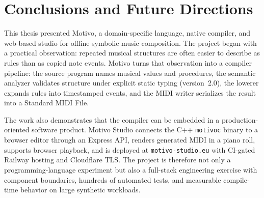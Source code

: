 \chapter{Conclusions and Future Directions}\label{ch:conclusion}

This thesis presented Motivo, a domain-specific language, native compiler, and web-based studio for offline symbolic
music composition.
The project began with a practical observation: repeated musical structures are often easier to describe as rules than
as copied note events.
Motivo turns that observation into a compiler pipeline: the source program names musical values and procedures, the
semantic analyzer validates structure under explicit static typing (version~2.0), the lowerer expands rules into
timestamped events, and the MIDI writer serializes the result into a Standard MIDI File.

The work also demonstrates that the compiler can be embedded in a production-oriented software product.
Motivo Studio connects the C++ \texttt{motivoc} binary to a browser editor through an Express API, renders generated
MIDI in a piano roll, supports browser playback, and is deployed at \texttt{motivo-studio.eu} with CI-gated Railway
hosting and Cloudflare TLS.
The project is therefore not only a programming-language experiment but also a full-stack engineering exercise with
component boundaries, hundreds of automated tests, and measurable compile-time behavior on large synthetic workloads.





